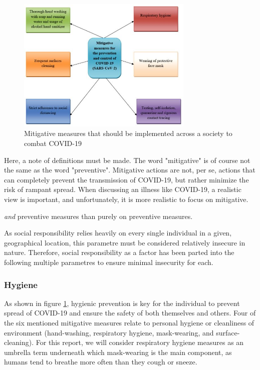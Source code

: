 \begin{figure}[H]
    \centering
    \includegraphics[width=0.75\textwidth]{0_billeder/mitigation of COVID-19.JPG}
    \caption{Mitigative measures that should be implemented across a society to combat COVID-19 \citep{ayenigbara_covid-19_2020}}
    \label{fig:Mitigative-Measures}
\end{figure}

Here, a note of definitions must be made. The word "mitigative" is of course not the same as the word "preventive". Mitigative actions are not, per se, actions that can completely prevent the transmission of COVID-19, but rather minimize the risk of rampant spread. When discussing an illness like COVID-19, a realistic view is important, and unfortunately, it is more realistic to focus on mitigative.

\textit{and} preventive measures than purely on preventive measures.

As social responsibility relies heavily on every single individual in a given, geographical location, this parametre must be considered relatively insecure in nature. Therefore, social responsibility as a factor has been parted into the following multiple parametres to ensure minimal insecurity for each.



\subsubsection{Hygiene}

As shown in figure \ref{fig:Mitigative-Measures}, hygienic prevention is key for the individual to prevent spread of COVID-19 and ensure the safety of both themselves and others. Four of the six mentioned mitigative measures relate to personal hygiene or cleanliness of environment (hand-washing, respiratory hygiene, mask-wearing, and surface-cleaning). For this report, we will consider respiratory hygiene measures as an umbrella term underneath which mask-wearing is the main component, as humans tend to breathe more often than they cough or sneeze.



